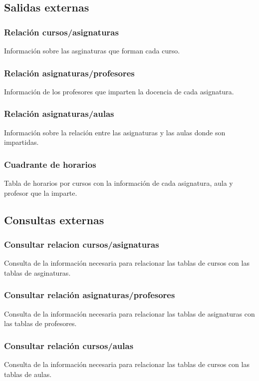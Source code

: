 \documentclass[11pt,a4paper,spanish,twoside]{book}
\begin{document}
\subsection{Salidas externas}
\subsubsection{Relación cursos/asignaturas}
Información sobre las asginaturas que forman cada curso.

\subsubsection{Relación asignaturas/profesores}
Información de los profesores que imparten la docencia de cada asignatura.

\subsubsection{Relación asignaturas/aulas}
Información sobre la relación entre las asignaturas y las aulas donde son
impartidas. 

\subsubsection{Cuadrante de horarios}
Tabla de horarios por cursos con la información de cada asignatura, aula y
profesor que la imparte.

\subsection{Consultas externas}
\subsubsection{Consultar relacion cursos/asignaturas}
Consulta de la información necesaria para relacionar las tablas de
cursos con las tablas de asginaturas.
\subsubsection{Consultar relación asignaturas/profesores}
Consulta de la información necesaria para relacionar las tablas de
asignaturas con las tablas de profesores.
\subsubsection{Consultar relación cursos/aulas}
Consulta de la información necesaria para relacionar las tablas de
cursos con las tablas de aulas.
\end{document}
